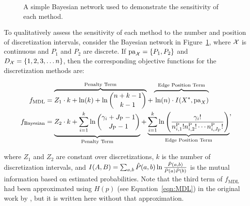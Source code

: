 \begin{figure}[ht]
  \centering
  
  \caption{A simple Bayesian network used to demonstrate the sensitivity of each method.}
  \label{fig:exp_discuss}
\end{figure}

To qualitatively assess the sensitivity of each method to the number and position of discretization intervals, consider the Bayesian network in Figure~\ref{fig:exp_discuss}, where $\mathcal{X}$ is continuous and $P_1$ and $P_2$ are discrete.
If $\Pa_{\cX} = \curly{P_1, P_2}$ and $D_{\cX} = \curly{1,2,3, \ldots n}$, then the corresponding objective functions for the discretization methods are:

\begin{small}
  \begin{equation}
  \begin{aligned}
  f_{\text{MDL}} & = \overbrace{Z_1 \cdot k + \ln(k) + \ln {{n +k - 1}\choose{k -1}} }^{\text{Penalty Term}}+   \overbrace{\rule{0pt}{1.35em} \ln(n) \cdot I(X^*, \Pa_X)}^{\text{Edge Position Term}} \\
  f_{\text{Bayesian}} &= \underbrace{{\vrule width0pt height0pt depth1.48em\relax}  Z_2 \cdot k + \sum_{i=1}^k \ln {{\gamma_i + J_\text{P} - 1}\choose{J_\text{P} -1}}}_{\text{Penalty Term}} + \underbrace{\sum^k_{i=1} \ln \left(   {{\gamma_i !}\over{n^{\text{P}}_{i,1}! n^{\text{P}}_{i,2}! \cdots n^{\text{P}}_{i,J_\text{P}}!    }} \right) }_{\text{Edge Position Term}}
  \end{aligned}\text{,}
  \end{equation}
\end{small}

\noindent
where $Z_1$ and $Z_2$ are constant over discretizations, $k$ is the number of discretization intervals, and $I\paren{A, B} = \sum_{a,b} \hat{P}(a,b) \ln\frac{\hat{P}(a,b)}{\hat{P}(a)\hat{P}(b)}$ is the mutual information based on estimated probabilities.
Note that the third term of $f_\text{MDL}$ had been approximated using $H(p)$ (see Equation~\ref{eqn:MDL}) in the original work by \cite{Friedman_1996}, but it is written here without that approximation.

